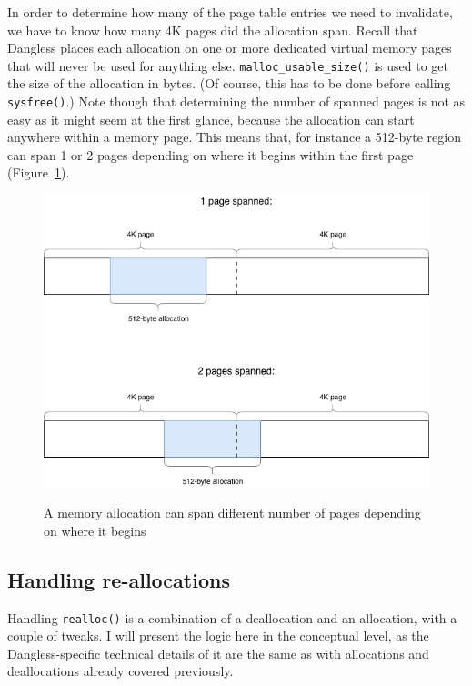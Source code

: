 In order to determine how many of the page table entries we need to invalidate, we have to know how many 4K pages did the allocation span. Recall that Dangless places each allocation on one or more dedicated virtual memory pages that will never be used for anything else. \lstinline!malloc_usable_size()! is used to get the size of the allocation in bytes. (Of course, this has to be done before calling \lstinline!sysfree()!.) Note though that determining the number of spanned pages is not as easy as it might seem at the first glance, because the allocation can start anywhere within a memory page. This means that, for instance a 512-byte region can span 1 or 2 pages depending on where it begins within the first page (Figure~\ref{fig:allocation-spanned-pages}).

\begin{figure}
	\centering
	\includegraphics[width=\textwidth]{diagrams/allocation_spanned_pages.png}
	\label{fig:allocation-spanned-pages}
	\caption{A memory allocation can span different number of pages depending on where it begins}
\end{figure}

\subsection{Handling re-allocations}

Handling \lstinline!realloc()! is a combination of a deallocation and an allocation, with a couple of tweaks. I will present the logic here in the conceptual level, as the Dangless-specific technical details of it are the same as with allocations and deallocations already covered previously.

